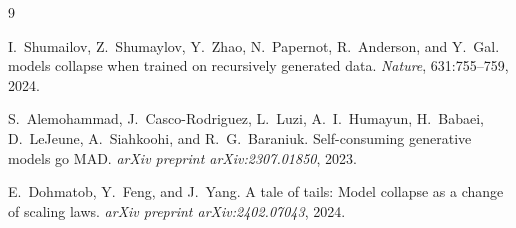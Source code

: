 \documentclass[11pt]{article}
\begin{document}

\begin{thebibliography}{9}

I.~Shumailov, Z.~Shumaylov, Y.~Zhao, N.~Papernot, R.~Anderson, and Y.~Gal.
 models collapse when trained on recursively generated data.
\newblock \emph{Nature}, 631:755--759, 2024.

S.~Alemohammad, J.~Casco-Rodriguez, L.~Luzi, A.~I.~Humayun, H.~Babaei,
  D.~LeJeune, A.~Siahkoohi, and R.~G.~Baraniuk.
\newblock Self-consuming generative models go {MAD}.
\newblock \emph{arXiv preprint arXiv:2307.01850}, 2023.

E.~Dohmatob, Y.~Feng, and J.~Yang.
\newblock A tale of tails: Model collapse as a change of scaling laws.
\newblock \emph{arXiv preprint arXiv:2402.07043}, 2024.

\end{thebibliography}
\end{document}
